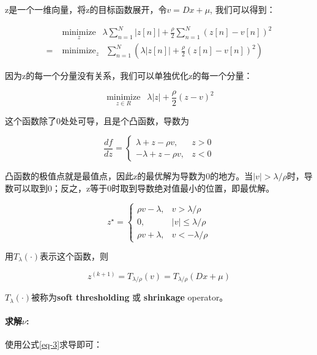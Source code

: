 \documentclass[10pt]{report}
\begin{document}
z是一个一维向量，将z的目标函数展开，令$v=Dx+\mu$, 我们可以得到：

\begin{equation}
\begin{aligned}
& \underset{z}{\operatorname{minimize}} \enspace \lambda \sum_{n=1}^{N}|z[n]|+\frac{\rho}{2} \sum_{n=1}^{N}(z[n]-v[n])^{2} \\
=& \operatorname{minimize}_{ z } \enspace \sum_{n=1}^{N}\left(\lambda|z[n]|+\frac{\rho}{2}(z[n]-v[n])^{2}\right)
\end{aligned}
\end{equation}


因为z的每一个分量没有关系，我们可以单独优化z的每一个分量：

\begin{equation}
\underset{z \in R }{\operatorname{minimize}} \enspace \lambda|z|+\frac{\rho}{2}(z-v)^{2}
\end{equation}

这个函数除了0处处可导，且是个凸函数，导数为

\begin{equation}
\frac{ d f}{ d z}=\left\{\begin{array}{ll}
\lambda+z-\rho v, & z>0 \\
-\lambda+z-\rho v, & z<0
\end{array}\right.
\end{equation}

凸函数的极值点就是最值点，因此z的最优解为导数为0的地方。当$|v| > \lambda/\rho$时，导数可以取到0；反之，z等于0时取到导数绝对值最小的位置，即最优解。

\begin{equation}
z^{\star}=\left\{\begin{array}{ll}
\rho v-\lambda, & v>\lambda/\rho \\
0, & |v| \leq \lambda/\rho \\
\rho v+\lambda, & v<-\lambda/\rho
\end{array}\right.
\end{equation}

用$T_\lambda(\cdot)$表示这个函数，则

\begin{equation}
	z^{(k+1)} = T_{\lambda/\rho}(v) = T_{\lambda/\rho}(Dx+\mu)
\end{equation}

$T_\lambda(\cdot)$被称为\textbf{soft thresholding} 或 \textbf{shrinkage} operator。

\paragraph{求解$\nu$: } 使用公式\ref{eq-3}求导即可：
\end{document}
